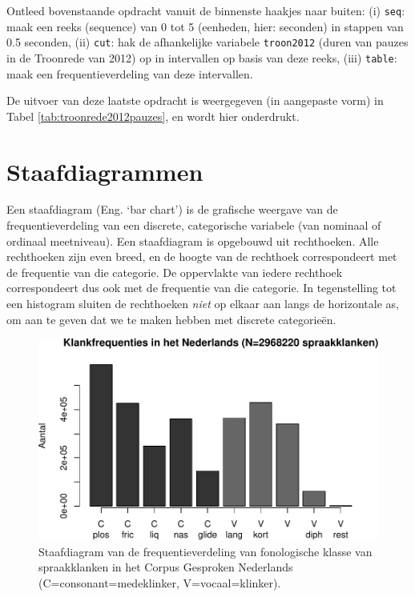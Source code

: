 \documentclass[
]{book}
\begin{document}
Ontleed bovenstaande opdracht vanuit de binnenste haakjes naar buiten:
(i) \texttt{seq}: maak een reeks (sequence) van 0 tot 5 (eenheden, hier: seconden) in stappen van 0.5 seconden,
(ii) \texttt{cut}: hak de afhankelijke variabele \texttt{troon2012} (duren van pauzes in de Troonrede van 2012) op in intervallen op basis van deze reeks,
(iii) \texttt{table}: maak een frequentieverdeling van deze intervallen.

De uitvoer van deze laatste opdracht is weergegeven (in aangepaste vorm) in Tabel \ref{tab:troonrede2012pauzes}, en wordt hier onderdrukt.

\hypertarget{sec:staafdiagrammen}{%
\section{Staafdiagrammen}\label{sec:staafdiagrammen}}

Een staafdiagram (Eng. `bar chart') is de grafische weergave van de
frequentieverdeling van een discrete, categorische variabele (van
nominaal of ordinaal meetniveau). Een staafdiagram is opgebouwd uit
rechthoeken. Alle rechthoeken zijn even breed, en de hoogte van de
rechthoek correspondeert met de frequentie van die categorie. De
oppervlakte van iedere rechthoek correspondeert dus ook met de
frequentie van die categorie. In tegenstelling tot een histogram sluiten
de rechthoeken \emph{niet} op elkaar aan langs de horizontale as, om aan te
geven dat we te maken hebben met discrete categorieën.

\begin{figure}
\centering
\includegraphics{KMS-NL_files/figure-latex/klankfreq-barplot-1.pdf}
\caption{\label{fig:klankfreq-barplot}Staafdiagram van de frequentieverdeling van fonologische klasse van spraakklanken in het Corpus Gesproken Nederlands (C=consonant=medeklinker, V=vocaal=klinker).}
\end{figure}
\end{document}
